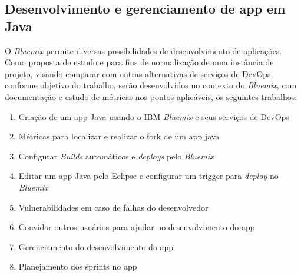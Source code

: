 \subsection{Desenvolvimento e gerenciamento de app em Java}

O \textit{Bluemix} permite diversas possibilidades de desenvolvimento de aplicações. Como proposta de estudo e para fins de normalização de uma instância de projeto, visando comparar com outras alternativas de serviços de DevOps, conforme objetivo do trabalho, serão desenvolvidos no contexto do \textit{Bluemix}, com documentação e estudo de métricas nos pontos aplicáveis, os seguintes trabalhos:
\begin{enumerate}
    \item Criação de um app Java usando o IBM \textit{Bluemix} e seus serviços de DevOps
    \item Métricas para localizar e realizar o fork de um app java
    \item Configurar \textit{Builds} automáticos e \textit{deploys} pelo \textit{Bluemix}
    \item Editar um app Java pelo Eclipse e configurar um trigger para \textit{deploy} no \textit{Bluemix}
    \item Vulnerabilidades em caso de falhas do desenvolvedor
    \item Convidar outros usuários para ajudar no desenvolvimento do app
    \item Gerenciamento do desenvolvimento do app
    \item Planejamento dos sprints no app
\end{enumerate}
